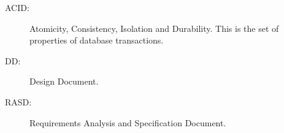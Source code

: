 \begin{description}
\item[ACID:] Atomicity, Consistency, Isolation and Durability. This is the set of properties of database transactions. 
\item[DD:] Design Document.
\item[RASD:] Requirements Analysis and Specification Document.
\end{description}
